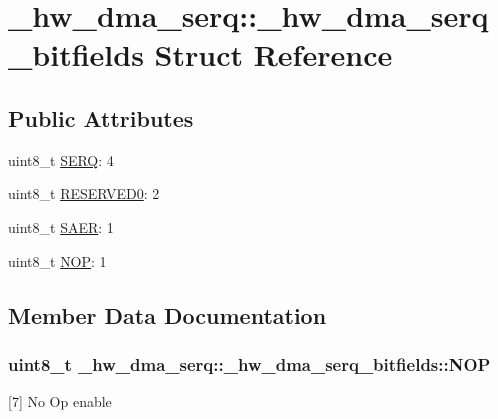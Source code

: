 \hypertarget{struct__hw__dma__serq_1_1__hw__dma__serq__bitfields}{}\section{\+\_\+hw\+\_\+dma\+\_\+serq\+:\+:\+\_\+hw\+\_\+dma\+\_\+serq\+\_\+bitfields Struct Reference}
\label{struct__hw__dma__serq_1_1__hw__dma__serq__bitfields}
\subsection*{Public Attributes}
\begin{DoxyCompactItemize}
\item 
uint8\+\_\+t \hyperlink{struct__hw__dma__serq_1_1__hw__dma__serq__bitfields_a1c8c8163f7adbfdb0c91821883d885c0}{S\+E\+RQ}\+: 4
\item 
uint8\+\_\+t \hyperlink{struct__hw__dma__serq_1_1__hw__dma__serq__bitfields_ad89ede54427929337a743845e97722fb}{R\+E\+S\+E\+R\+V\+E\+D0}\+: 2
\item 
uint8\+\_\+t \hyperlink{struct__hw__dma__serq_1_1__hw__dma__serq__bitfields_a8cc35592d815f1752d4b73bddc3e80be}{S\+A\+ER}\+: 1
\item 
uint8\+\_\+t \hyperlink{struct__hw__dma__serq_1_1__hw__dma__serq__bitfields_ac47ca8617890fb7b1d4e25dd92d680ce}{N\+OP}\+: 1
\end{DoxyCompactItemize}


\subsection{Member Data Documentation}
\subsubsection[{\texorpdfstring{N\+OP}{NOP}}]{\setlength{\rightskip}{0pt plus 5cm}uint8\+\_\+t \+\_\+hw\+\_\+dma\+\_\+serq\+::\+\_\+hw\+\_\+dma\+\_\+serq\+\_\+bitfields\+::\+N\+OP}\hypertarget{struct__hw__dma__serq_1_1__hw__dma__serq__bitfields_ac47ca8617890fb7b1d4e25dd92d680ce}{}\label{struct__hw__dma__serq_1_1__hw__dma__serq__bitfields_ac47ca8617890fb7b1d4e25dd92d680ce}
\mbox{[}7\mbox{]} No Op enable 
